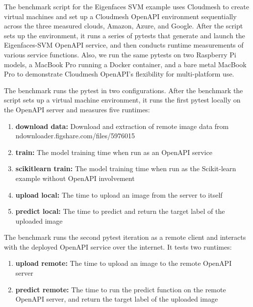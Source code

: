 The benchmark script for the Eigenfaces SVM example uses Cloudmesh to
create virtual machines and set up a Cloudmesh OpenAPI environment
sequentially across the three measured clouds, Amazon, Azure,
and Google. After the script sets up the environment, it runs a series
of pytests that generate and launch the Eigenfaces-SVM OpenAPI service,
and then conducts runtime measurements of various service functions. Also, we run the same pytests on two Raspberry Pi models, a MacBook Pro running a Docker container, and a bare metal MacBook Pro to demonstrate Cloudmesh OpenAPI's flexibility for multi-platform use.

The benchmark runs the pytest in two configurations. After the benchmark
the script sets up a virtual machine environment, it runs the first pytest
locally on the OpenAPI server and measures five runtimes:

\begin{enumerate}
\def\labelenumi{\arabic{enumi}.}
\item \textbf{download data:} Download and extraction of remote image data from
  ndownloader.figshare.com/files/5976015
\item \textbf{train:} 
  The model training time when run as an OpenAPI service
\item \textbf{scikitlearn train:} 
  The model training time when run as the Scikit-learn example without
  OpenAPI involvement
\item \textbf{upload local:} 
  The time to upload an image from the server to itself
\item \textbf{predict local:} 
  The time to predict and return the target label of the uploaded image
\end{enumerate}

The benchmark runs the second pytest iteration as a remote client and interacts with the deployed OpenAPI service over the internet. It tests two runtimes:

\begin{enumerate}
\def\labelenumi{\arabic{enumi}.}
\item \textbf{upload remote:} 
  The time to upload an image to the remote OpenAPI server
\item \textbf{predict remote:} 
  The time to run the predict function on the remote OpenAPI server, and
  return the target label of the uploaded image
\end{enumerate}

